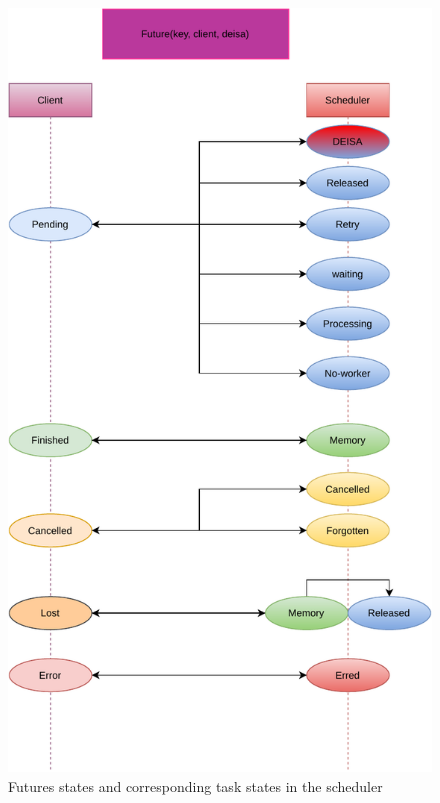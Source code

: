 \begin{figure}\centering
\includegraphics[scale=0.65]{figures/FutureStateClient.pdf}
\caption{Futures states and corresponding task states in the scheduler}
\label{figfuturestate}
\end{figure}

